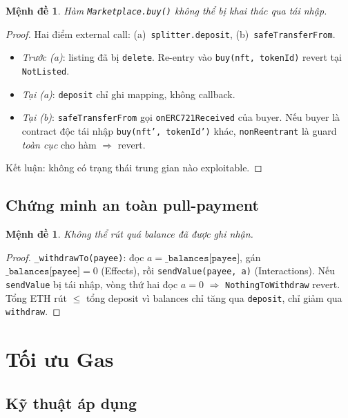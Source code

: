 \documentclass[12pt,a4paper,oneside]{report}
\theoremstyle{plain}
\newtheorem{proposition}[theorem]{Mệnh đề}
\theoremstyle{definition}
\theoremstyle{remark}
\begin{document}
\begin{proposition}
Hàm \texttt{Marketplace.buy()} không thể bị khai thác qua tái nhập.
\end{proposition}
\begin{proof}
Hai điểm external call: (a)~\texttt{splitter.deposit}, (b)~\texttt{safeTransferFrom}.
\begin{itemize}
  \item \textit{Trước (a)}: listing đã bị \texttt{delete}. Re-entry vào \texttt{buy(nft, tokenId)}
        revert tại \texttt{NotListed}.
  \item \textit{Tại (a)}: \texttt{deposit} chỉ ghi mapping, không callback.
  \item \textit{Tại (b)}: \texttt{safeTransferFrom} gọi \texttt{onERC721Received} của buyer.
        Nếu buyer là contract độc tái nhập \texttt{buy(nft', tokenId')} khác,
        \texttt{nonReentrant} là guard \emph{toàn cục} cho hàm $\Rightarrow$ revert.
\end{itemize}
Kết luận: không có trạng thái trung gian nào exploitable.
\end{proof}

\section{Chứng minh an toàn pull-payment}

\begin{proposition}
Không thể rút quá balance đã được ghi nhận.
\end{proposition}
\begin{proof}
\texttt{\_withdrawTo(payee)}: đọc $a = \texttt{\_balances[payee]}$, gán
$\texttt{\_balances[payee]} = 0$ (Effects), rồi \texttt{sendValue(payee, a)} (Interactions).
Nếu \texttt{sendValue} bị tái nhập, vòng thứ hai đọc $a = 0$ $\Rightarrow$
\texttt{NothingToWithdraw} revert. Tổng ETH rút $\le$ tổng deposit vì balances chỉ tăng qua
\texttt{deposit}, chỉ giảm qua \texttt{withdraw}.
\end{proof}

\chapter{Tối ưu Gas}
\label{chap:gas}

\section{Kỹ thuật áp dụng}
\end{document}
